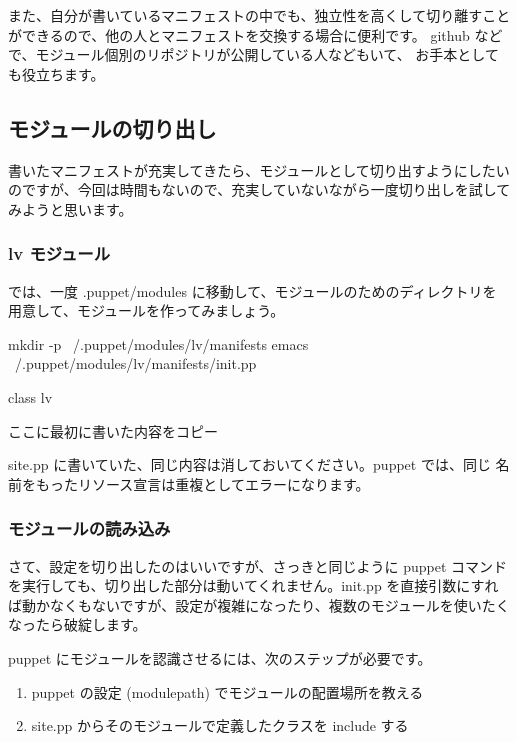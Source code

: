 \documentclass[mingoth,a4paper]{jsarticle}
\begin{document}
また、自分が書いているマニフェストの中でも、独立性を高くして切り離すこと
ができるので、他の人とマニフェストを交換する場合に便利です。
github などで、モジュール個別のリポジトリが公開している人などもいて、
お手本としても役立ちます。

\subsection{モジュールの切り出し}

書いたマニフェストが充実してきたら、モジュールとして切り出すようにしたい
のですが、今回は時間もないので、充実していないながら一度切り出しを試して
みようと思います。

\subsubsection{lv モジュール}

では、一度 .puppet/modules に移動して、モジュールのためのディレクトリを
用意して、モジュールを作ってみましょう。

\begin{commandline}
mkdir -p ~/.puppet/modules/lv/manifests
emacs ~/.puppet/modules/lv/manifests/init.pp
\end{commandline}
 
\begin{commandline}
class lv {

ここに最初に書いた内容をコピー

}
\end{commandline}

site.pp に書いていた、同じ内容は消しておいてください。puppet では、同じ
名前をもったリソース宣言は重複としてエラーになります。

\subsubsection{モジュールの読み込み}

さて、設定を切り出したのはいいですが、さっきと同じように puppet コマンド
を実行しても、切り出した部分は動いてくれません。init.pp を直接引数にすれ
ば動かなくもないですが、設定が複雑になったり、複数のモジュールを使いたく
なったら破綻します。

puppet にモジュールを認識させるには、次のステップが必要です。

\begin{enumerate}
 \item puppet の設定 (modulepath) でモジュールの配置場所を教える
 \item site.pp からそのモジュールで定義したクラスを include する
\end{enumerate}
\end{document}
